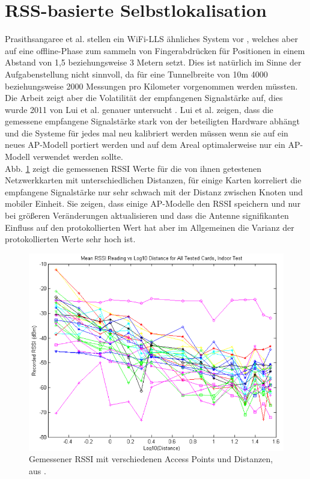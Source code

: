 \section{RSS-basierte Selbstlokalisation}
\label{ch:Vorherige:sec:RSS-basierte}
Prasithsangaree et al. stellen ein WiFi-LLS ähnliches System vor \cite{prasithsangaree2002indoor}, welches aber auf eine offline-Phase zum sammeln von Fingerabdrücken für Positionen in einem Abstand von 1,5 beziehungsweise 3 Metern setzt. 
Dies ist natürlich im Sinne der Aufgabenstellung nicht sinnvoll, da für eine Tunnelbreite von 10m 4000 beziehungsweise 2000 Messungen pro Kilometer vorgenommen werden müssten.\\
Die Arbeit zeigt aber die Volatilität der empfangenen Signalstärke auf, dies wurde 2011 von Lui et al. genauer untersucht \cite{lui2011differences}.
Lui et al. zeigen, dass die gemessene empfangene Signalstärke stark von der beteiligten Hardware abhängt und die Systeme für jedes mal neu kalibriert werden müssen wenn sie auf ein neues AP-Modell portiert werden und auf dem Areal optimalerweise nur ein AP-Modell verwendet werden sollte. \\
Abb. \ref{fig:luiRSSI} zeigt die gemessenen RSSI Werte für die von ihnen getestenen Netzwerkkarten mit unterschiedlichen Distanzen, für einige Karten korreliert die empfangene Signalstärke nur sehr schwach mit der Distanz zwischen Knoten und mobiler Einheit.
Sie zeigen, dass einige AP-Modelle den RSSI speichern und nur bei größeren Veränderungen aktualisieren und dass die Antenne signifikanten Einfluss auf den protokollierten Wert hat aber im Allgemeinen die Varianz der protokollierten Werte sehr hoch ist.

\begin{figure}[h]
  \centering
	\includegraphics[width=\textwidth]{images/luiRSSI.png}
  \caption{Gemessener RSSI mit verschiedenen Access Points und Distanzen, aus \cite{lui2011differences}.}
  \label{fig:luiRSSI}
\end{figure}

